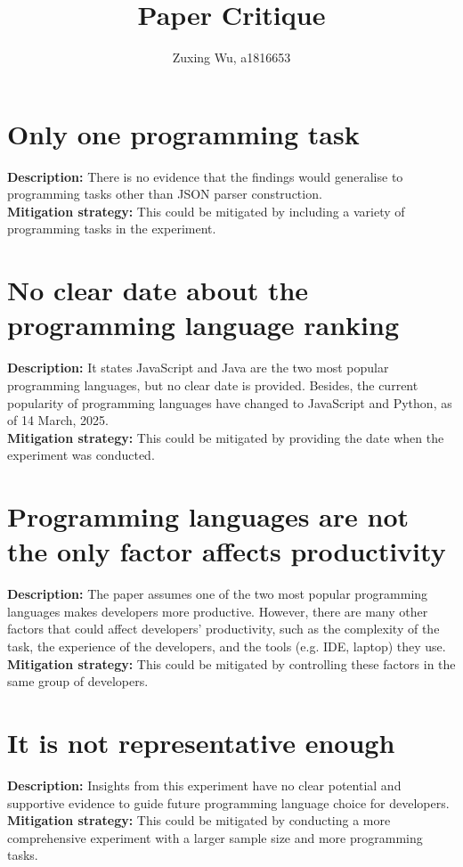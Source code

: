 \documentclass{article}
\title{Paper Critique}
\author{Zuxing Wu, a1816653}
\date{}
\begin{document}
\maketitle

\section{Only one programming task}
\textbf{Description:} There is no evidence that the findings would generalise to programming tasks other than JSON parser construction.\\
\textbf{Mitigation strategy:} This could be mitigated by including a variety of programming tasks in the experiment.

\section{No clear date about the programming language ranking}
\textbf{Description:} It states JavaScript and Java are the two most popular programming languages, but no clear date is provided. Besides, the current popularity of programming languages have changed to JavaScript and Python, as of 14 March, 2025.\\
\textbf{Mitigation strategy:} This could be mitigated by providing the date when the experiment was conducted.

\section{Programming languages are not the only factor affects productivity}
\textbf{Description:} The paper assumes one of the two most popular programming languages makes developers more productive. However, there are many other factors that could affect developers' productivity, such as the complexity of the task, the experience of the developers, and the tools (e.g. IDE, laptop) they use.\\
\textbf{Mitigation strategy:} This could be mitigated by controlling these factors in the same group of developers.

\section{It is not representative enough}
\textbf{Description:} Insights from this experiment have no clear potential and supportive evidence to guide future programming language choice for developers.\\
\textbf{Mitigation strategy:} This could be mitigated by conducting a more comprehensive experiment with a larger sample size and more programming tasks.
\end{document}
